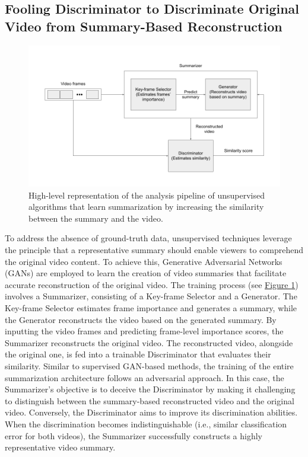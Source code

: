 \subsection{Fooling Discriminator to Discriminate Original Video from Summary-Based Reconstruction}
\label{section:rel-unsup-discriminative}

\begin{figure}[ht]
    \centering
    \includegraphics[width=0.73\paperwidth]{content/related/figures/unsup-gan.png}
    \caption{High-level representation of the analysis pipeline of unsupervised
    algorithms that learn summarization by increasing the similarity between the
    summary and the video.}
    \label{figure:rel-unsup-gan}
  \end{figure}

To address the absence of ground-truth data, unsupervised techniques leverage the principle that a representative summary should enable viewers to comprehend the original video content. To achieve this, Generative Adversarial Networks (GANs) are employed to learn the creation of video summaries that facilitate accurate reconstruction of the original video. The training process (see \hyperref[figure:rel-unsup-gan]{Figure \ref{figure:rel-unsup-gan}}) involves a Summarizer, consisting of a Key-frame Selector and a Generator. The Key-frame Selector estimates frame importance and generates a summary, while the Generator reconstructs the video based on the generated summary. By inputting the video frames and predicting frame-level importance scores, the Summarizer reconstructs the original video. The reconstructed video, alongside the original one, is fed into a trainable Discriminator that evaluates their similarity. Similar to supervised GAN-based methods, the training of the entire summarization architecture follows an adversarial approach. In this case, the Summarizer's objective is to deceive the Discriminator by making it challenging to distinguish between the summary-based reconstructed video and the original video. Conversely, the Discriminator aims to improve its discrimination abilities. When the discrimination becomes indistinguishable (i.e., similar classification error for both videos), the Summarizer successfully constructs a highly representative video summary.  

